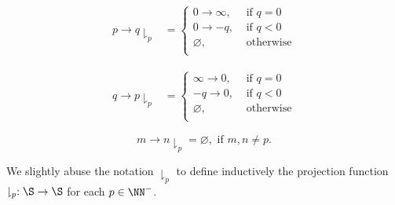 \begin{center}
  \begin{minipage}{0.48\textwidth}
    $$\begin{array}{rlr}
        p\rightarrow q \downharpoonright_p & =

        \begin{cases}
          0\rightarrow \infty, & \text{ if } q=0   \\
          0\rightarrow -q,     & \text{ if } q < 0 \\
          \varnothing,         & \text{ otherwise} \\
        \end{cases}
      \end{array}$$
  \end{minipage}
  \hfill
  \begin{minipage}{0.48\textwidth}
    $$\begin{array}{rlr}
        q\rightarrow p \downharpoonright_p & =
        \begin{cases}
          \infty\rightarrow 0, & \text{ if } q=0   \\
          -q\rightarrow 0,     & \text{ if } q < 0 \\
          \varnothing,         & \text{ otherwise} \\
        \end{cases}
      \end{array}$$
  \end{minipage}

  $$m\rightarrow n \downharpoonright_p = \varnothing, \text{ if } m,n\ne p.$$
\end{center}

We slightly abuse the notation $\downharpoonright_p$ to define inductively the projection function $\downharpoonright_p : \S\to\S$ for each $p\in\NN^{-}$.

